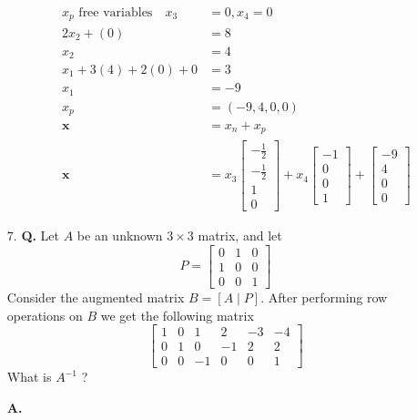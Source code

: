\documentclass[main.tex]{subfiles}
\begin{document}
\begin{enumerate}
\begin{enumerate}
    $$
    \begin{aligned}
    x_p \text{ free variables} \quad x_3 &= 0, x_4 = 0\\
    2x_2 + (0) &= 8 \\
    x_2 &= 4 \\
    x_1 + 3(4) + 2(0) + 0 &= 3 \\
    x_1 &= -9 \\
    x_p &= (-9,4,0,0)\\
    \bm{x} & = x_n + x_p \\
    \bm{x}&=x_3\left[\begin{array}{c}
    -\frac{1}{2} \\
    -\frac{1}{2} \\
    1 \\
    0
    \end{array}\right]+x_4\left[\begin{array}{c}
    -1 \\
    0 \\
    0 \\
    1
    \end{array}\right]+\left[\begin{array}{c}
    -9 \\
    4 \\
    0 \\
    0
    \end{array}\right]
    \end{aligned}
    $$
    
    \end{enumerate}
    
\item[7.] \textbf{Q.} Let $A$ be an unknown $3 \times 3$ matrix, and let
    $$
    P=\left[\begin{array}{lll}
    0 & 1 & 0 \\
    1 & 0 & 0 \\
    0 & 0 & 1
    \end{array}\right]
    $$
    Consider the augmented matrix $B=[A \mid P]$. After performing row operations on $B$ we get the following matrix
    $$
    \left[\begin{array}{ccc|ccc}
    1 & 0 & 1 & 2 & -3 & -4 \\
    0 & 1 & 0 & -1 & 2 & 2 \\
    0 & 0 & -1 & 0 & 0 & 1
    \end{array}\right]
    $$
    What is $A^{-1}$ ?
    
    \textbf{A.}
    

\end{enumerate}
\end{document}
